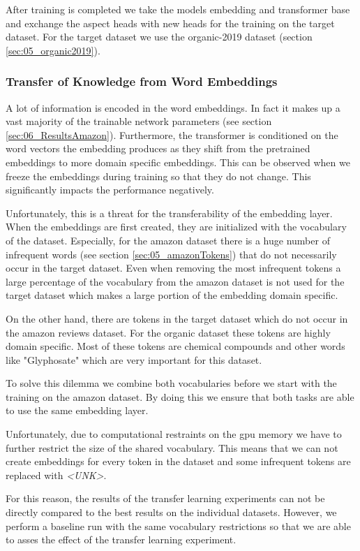 After training is completed we take the models embedding and transformer base and exchange the aspect heads with new heads for the training on the target dataset. For the target dataset we use  the organic-2019 dataset {(section \ref{sec:05_organic2019})}.
\bigskip

\subsubsection*{Transfer of Knowledge from Word Embeddings}

A lot of information is encoded in the word embeddings. In fact it makes up a vast majority of the trainable network parameters {(see section \ref{sec:06_ResultsAmazon})}. Furthermore, the transformer is conditioned on the word vectors the embedding produces as they shift from the pretrained embeddings to more domain specific embeddings. This can be observed when we freeze the embeddings during training so that they do not change. This significantly impacts the performance negatively.
\medskip

Unfortunately, this is a threat for the transferability of the embedding layer. When the embeddings are first created, they are initialized with the vocabulary of the dataset. Especially, for the amazon dataset there is a huge number of infrequent words {(see section \ref{sec:05_amazonTokens})} that do not necessarily occur in the target dataset. Even when removing the most infrequent tokens a large percentage of the vocabulary from the amazon dataset is not used for the target dataset which makes a large portion of the embedding domain specific. 
\medskip

On the other hand, there are tokens in the target dataset which do not occur in the amazon reviews dataset. For the organic dataset these tokens are highly domain specific. Most of these tokens are chemical compounds and other words like "Glyphosate" which are very important for this dataset.
\medskip

To solve this dilemma we combine both vocabularies before we start with the training on the amazon dataset. By doing this we ensure that both tasks are able to use the same embedding layer. 

Unfortunately, due to computational restraints on the \gls{gpu} memory we have to further restrict the size of the shared vocabulary. This means that we can not create embeddings for every token in the dataset and some infrequent tokens are replaced with \textit{<UNK>}.
\medskip

For this reason, the results of the transfer learning experiments can not be directly compared to the best results on the individual datasets. However, we perform a baseline run with the same vocabulary restrictions so that we are able to asses the effect of the transfer learning experiment.





